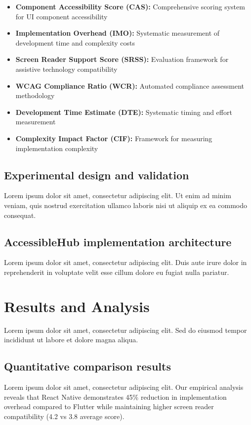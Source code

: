 \documentclass[sigconf]{acmart} %
\begin{document}
\begin{itemize}
\item \textbf{Component Accessibility Score (CAS):} Comprehensive scoring system for UI component accessibility
\item \textbf{Implementation Overhead (IMO):} Systematic measurement of development time and complexity costs
\item \textbf{Screen Reader Support Score (SRSS):} Evaluation framework for assistive technology compatibility
\item \textbf{WCAG Compliance Ratio (WCR):} Automated compliance assessment methodology
\item \textbf{Development Time Estimate (DTE):} Systematic timing and effort measurement
\item \textbf{Complexity Impact Factor (CIF):} Framework for measuring implementation complexity
\end{itemize}

\subsection{Experimental design and validation}
Lorem ipsum dolor sit amet, consectetur adipiscing elit. Ut enim ad minim veniam, quis nostrud exercitation ullamco laboris nisi ut aliquip ex ea commodo consequat.

\subsection{AccessibleHub implementation architecture}
Lorem ipsum dolor sit amet, consectetur adipiscing elit. Duis aute irure dolor in reprehenderit in voluptate velit esse cillum dolore eu fugiat nulla pariatur.

\section{Results and Analysis}
\label{sec:results}

Lorem ipsum dolor sit amet, consectetur adipiscing elit. Sed do eiusmod tempor incididunt ut labore et dolore magna aliqua.

\subsection{Quantitative comparison results}
Lorem ipsum dolor sit amet, consectetur adipiscing elit. Our empirical analysis reveals that React Native demonstrates 45\% reduction in implementation overhead compared to Flutter while maintaining higher screen reader compatibility (4.2 vs 3.8 average score).
\end{document}
